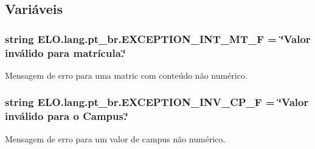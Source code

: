 \subsection{Variáveis}
\hypertarget{namespaceELO_1_1lang_1_1pt__br_a1b63b665c3b42f0f393a5c41e40dc888}{
\subsubsection[{E\-X\-C\-E\-P\-T\-I\-O\-N\-\_\-\-I\-N\-T\-\_\-\-M\-T\-\_\-\-F}]{\setlength{\rightskip}{0pt plus 5cm}string E\-L\-O.\-lang.\-pt\-\_\-br.\-E\-X\-C\-E\-P\-T\-I\-O\-N\-\_\-\-I\-N\-T\-\_\-\-M\-T\-\_\-\-F = \char`\"{}Valor inválido para matrícula.\char`\"{}}}\label{d5/d70/namespaceELO_1_1lang_1_1pt__br_a1b63b665c3b42f0f393a5c41e40dc888}


Mensagem de erro para uma matric com conteúdo não numérico. 

\hypertarget{namespaceELO_1_1lang_1_1pt__br_a7819a19b8f01bae3ab0769603a6271a6}{
\subsubsection[{E\-X\-C\-E\-P\-T\-I\-O\-N\-\_\-\-I\-N\-V\-\_\-\-C\-P\-\_\-\-F}]{\setlength{\rightskip}{0pt plus 5cm}string E\-L\-O.\-lang.\-pt\-\_\-br.\-E\-X\-C\-E\-P\-T\-I\-O\-N\-\_\-\-I\-N\-V\-\_\-\-C\-P\-\_\-\-F = \char`\"{}Valor inválido para o Campus.\char`\"{}}}\label{d5/d70/namespaceELO_1_1lang_1_1pt__br_a7819a19b8f01bae3ab0769603a6271a6}


Mensagem de erro para um valor de campus não numérico. 

